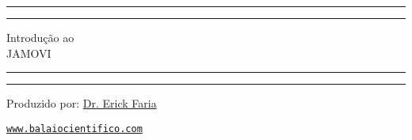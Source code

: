 \begin{titlepage}
	\centering %
	\scshape %
	\vspace*{1.5\baselineskip} %

	\rule{13cm}{1.6pt}\vspace*{-\baselineskip}\vspace*{2pt} %
	\rule{13cm}{0.4pt} %
	
		\vspace{0.75\baselineskip} %
	{	\Huge Introdução ao\\ 
			\vspace{4mm}
		JAMOVI \\	}
		\vspace{0.75\baselineskip} %
	\rule{13cm}{0.4pt}\vspace*{-\baselineskip}\vspace{3.2pt} %
	\rule{13cm}{1.6pt} %
	
		\vspace{1.75\baselineskip} %
	{\large Produzido por: \href{https://www.balaiocientifico.com/author/erickfaria/?utm_source=apostila_jamovi&utm_medium=pdf}{Dr. Erick Faria} \\
		\vspace*{1.2\baselineskip}}
	\vfill
	
\href{https://www.balaiocientifico.com/?utm_source=apostila_jamovi&utm_medium=pdf}{\texttt{www.balaiocientifico.com}}\\
\vspace{0.5cm}
\ccby
\end{titlepage}